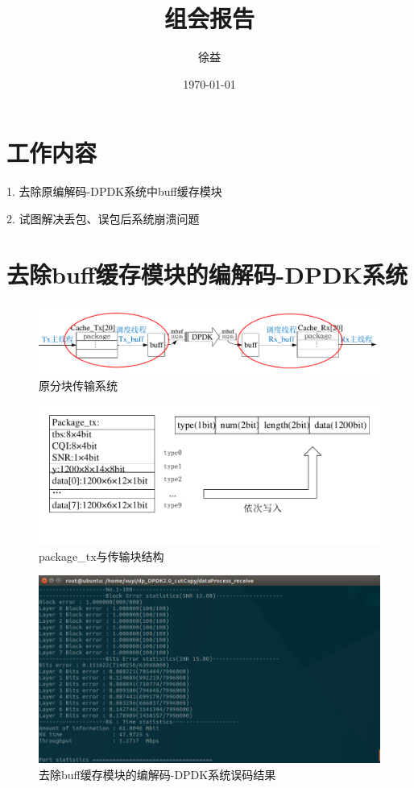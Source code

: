 \documentclass{article}
\title{组会报告}
\author{徐益}
\date{\today}
\begin{document}
\maketitle


\section{工作内容}

1. 去除原编解码-DPDK系统中buff缓存模块

2. 试图解决丢包、误包后系统崩溃问题

\section{去除buff缓存模块的编解码-DPDK系统}


\begin{figure}[H]
	\centering
	\includegraphics[width = \textwidth]{frame_sys_copy.pdf}
	\caption{原分块传输系统}
\end{figure}
\begin{figure}[H]
	\centering
	\includegraphics[width = \textwidth]{straight_write_frame.pdf}
	\caption{package\_tx与传输块结构}
\end{figure}
\begin{figure}[H]
	\centering
	\includegraphics[width = .8\textwidth]{dp2_cutcopy_result.png}
	\caption{去除buff缓存模块的编解码-DPDK系统误码结果}
\end{figure}
\end{document}
